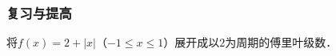 \documentclass[14pt,notheorems,leqno,xcolor={rgb}]{beamer} %
\begin{document}

\begin{frame}
\frametitle{复习与提高}
\begin{puzzle}
将$f(x)=2+|x|$（$-1\le x\le 1$）展开成以$2$为周期的傅里叶级数．
\end{puzzle}
\end{frame}

\fi %
\end{document}
